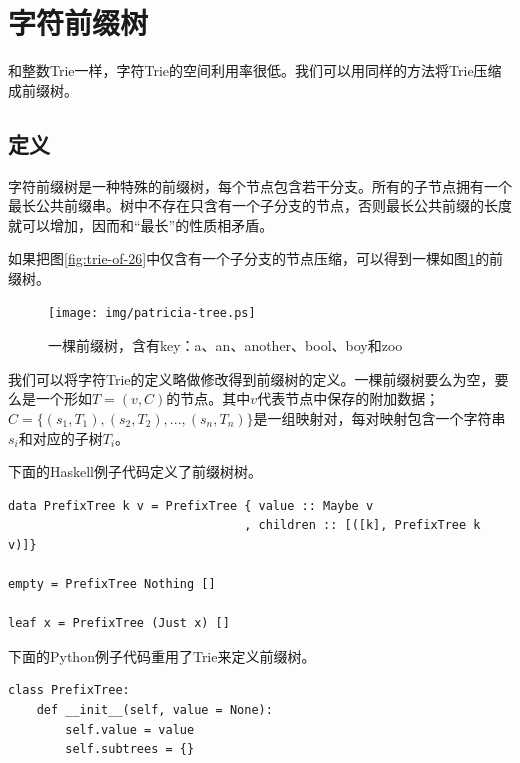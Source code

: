 \documentclass[b5paper]{ctexart}
\begin{document}
\section{字符前缀树}

和整数Trie一样，字符Trie的空间利用率很低。我们可以用同样的方法将Trie压缩成前缀树。

\subsection{定义}

字符前缀树是一种特殊的前缀树，每个节点包含若干分支。所有的子节点拥有一个最长公共前缀串。树中不存在只含有一个子分支的节点，否则最长公共前缀的长度就可以增加，因而和“最长”的性质相矛盾。

如果把图\ref{fig:trie-of-26}中仅含有一个子分支的节点压缩，可以得到一棵如图\ref{fig:patricia-tree}的前缀树。

\begin{figure}[htbp]
  \centering
  \texttt{[image: img/patricia-tree.ps]}
  \caption{一棵前缀树，含有key：a、an、another、bool、boy和zoo}
  \label{fig:patricia-tree}
\end{figure}

我们可以将字符Trie的定义略做修改得到前缀树的定义。一棵前缀树要么为空，要么是一个形如$T = (v, C)$的节点。其中$v$代表节点中保存的附加数据；$C = \{(s_1, T_1), (s_2, T_2), ..., (s_n, T_n)\}$是一组映射对，每对映射包含一个字符串$s_i$和对应的子树$T_i$。

下面的Haskell例子代码定义了前缀树树。

\lstset{language=Haskell}
\begin{lstlisting}[style=Haskell]
data PrefixTree k v = PrefixTree { value :: Maybe v
                                 , children :: [([k], PrefixTree k v)]}

empty = PrefixTree Nothing []

leaf x = PrefixTree (Just x) []
\end{lstlisting}

下面的Python例子代码重用了Trie来定义前缀树。

\lstset{language=Python}
\begin{lstlisting}
class PrefixTree:
    def __init__(self, value = None):
        self.value = value
        self.subtrees = {}
\end{lstlisting}
\end{document}
